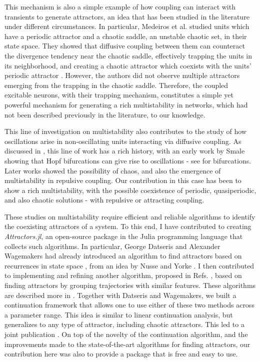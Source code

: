 This mechanism is also a simple example of how coupling can interact with transients to generate attractors, an idea that has been studied in the literature under different circumstances. In particular, Medeiros et al. studied units which have a periodic attractor and a chaotic saddle, an unstable chaotic set, in their state space. They showed that diffusive coupling between them can counteract the divergence tendency near the chaotic saddle, effectively trapping the units in its neighborhood, and creating a chaotic attractor which coexists with the units' periodic attractor \cite{medeiros2018boundaries, medeiros2019state}. However, the authors did not observe multiple attractors emerging from the trapping in the chaotic saddle. Therefore, the coupled excitable neurons, with their trapping mechanism, constitutes a simple yet powerful mechanism for generating a rich multistability in networks, which had not been described previously in the literature, to our knowledge.

This line of investigation on multistability also contributes to the study of how oscillations arise in non-oscillating units interacting via diffusive coupling. As discussed in , this line of work has a rich history, with an early work by Smale showing that Hopf bifurcations can give rise to oscillations \cite{smale1976a} - see  for bifurcations. Later works showed the possibility of chaos, and also the emergence of multistability in repulsive coupling. Our contribution in this case has been to show a rich multistability, with the possible coexistence of periodic, quasiperiodic, and also chaotic solutions - with repulsive or attracting coupling. 

These studies on multistability require efficient and reliable algorithms to identify the coexisting attractors of a system. To this end, I have contributed to creating \textit{Attractors.jl}, an open-source package in the Julia programming language that collects such algorithms. In particular, George Datseris and Alexander Wagemakers had already introduced an algorithm to find attractors based on recurrences in state space \cite{datseris2022effortless}, from an idea by Nusse and Yorke \cite{nusse1994dynamics}. I then contributed to implementing and refining another algorithm, proposed in Refs. \cite{stender2021bstab, gelbrecht2020monte}, based on finding attractors by grouping trajectories with similar features. These algorithms are described more in . Together with Datseris and Wagemakers, we built a continuation framework that allows one to use either of these two methods across a parameter range. This idea is similar to linear continuation analysis, but generalizes to any type of attractor, including chaotic attractors. This led to a joint publication \cite{datseris2023framework}. On top of the novelty of the continuation algorithm, and the improvements made to the state-of-the-art algorithms for finding attractors, our contribution here was also to provide a package that is free and easy to use. 

